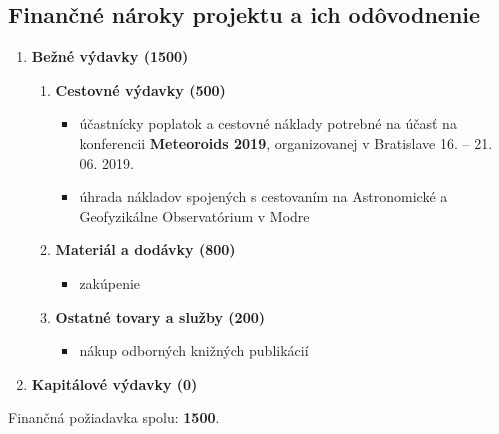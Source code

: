 \subsection{Finančné nároky projektu a ich
odôvodnenie}\label{finanux10dnuxe9-nuxe1roky-projektu-a-ich-oduxf4vodnenie}

\begin{enumerate}
\def\labelenumi{\arabic{enumi}.}
\tightlist
\item
  \textbf{Bežné výdavky (\SI{1500}{\eur})}

  \begin{enumerate}
  \def\labelenumii{\alph{enumii}.}
  \tightlist
  \item
    \textbf{Cestovné výdavky (\SI{500}{\eur})}

    \begin{itemize}
    \tightlist
    \item
      účastnícky poplatok a cestovné náklady potrebné na účasť na
      konferencii \textbf{Meteoroids 2019}, organizovanej v Bratislave
      16. -- 21. 06. 2019.
    \item
      úhrada nákladov spojených s cestovaním na Astronomické a
      Geofyzikálne Observatórium v Modre
    \end{itemize}
  \item
    \textbf{Materiál a dodávky (\SI{800}{\eur})}

    \begin{itemize}
    \tightlist
    \item
      zakúpenie
    \end{itemize}
  \item
    \textbf{Ostatné tovary a služby (\SI{200}{\eur})}

    \begin{itemize}
    \tightlist
    \item
      nákup odborných knižných publikácií
    \end{itemize}
  \end{enumerate}
\item
  \textbf{Kapitálové výdavky (\SI{0}{\eur})}
\end{enumerate}

Finančná požiadavka spolu: \textbf{\SI{1500}{\eur}}.
